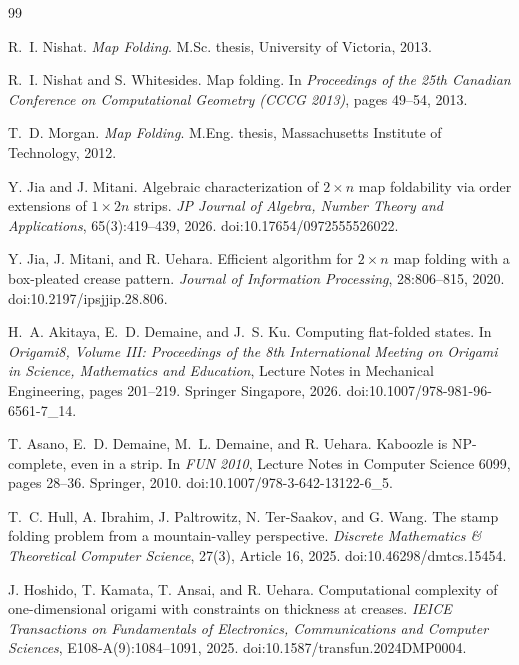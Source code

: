 \begin{thebibliography}{99}

R.~I. Nishat.
\newblock \emph{Map Folding}.
\newblock M.Sc. thesis, University of Victoria, 2013.

R.~I. Nishat and S. Whitesides.
\newblock Map folding.
\newblock In \emph{Proceedings of the 25th Canadian Conference on Computational Geometry (CCCG 2013)}, pages 49--54, 2013.

T.~D. Morgan.
\newblock \emph{Map Folding}.
\newblock M.Eng. thesis, Massachusetts Institute of Technology, 2012.

Y. Jia and J. Mitani.
\newblock Algebraic characterization of $2\times n$ map foldability via order extensions of $1\times 2n$ strips.
\newblock \emph{JP Journal of Algebra, Number Theory and Applications}, 65(3):419--439, 2026.
\newblock doi:10.17654/0972555526022.

Y. Jia, J. Mitani, and R. Uehara.
\newblock Efficient algorithm for $2\times n$ map folding with a box-pleated crease pattern.
\newblock \emph{Journal of Information Processing}, 28:806--815, 2020.
\newblock doi:10.2197/ipsjjip.28.806.

H.~A. Akitaya, E.~D. Demaine, and J.~S. Ku.
\newblock Computing flat-folded states.
\newblock In \emph{Origami8, Volume III: Proceedings of the 8th International Meeting on Origami in Science, Mathematics and Education}, Lecture Notes in Mechanical Engineering, pages 201--219. Springer Singapore, 2026.
\newblock doi:10.1007/978-981-96-6561-7\_14.

T. Asano, E.~D. Demaine, M.~L. Demaine, and R. Uehara.
\newblock Kaboozle is NP-complete, even in a strip.
\newblock In \emph{FUN 2010}, Lecture Notes in Computer Science 6099, pages 28--36. Springer, 2010.
\newblock doi:10.1007/978-3-642-13122-6\_5.

T.~C. Hull, A. Ibrahim, J. Paltrowitz, N. Ter-Saakov, and G. Wang.
\newblock The stamp folding problem from a mountain-valley perspective.
\newblock \emph{Discrete Mathematics \& Theoretical Computer Science}, 27(3), Article 16, 2025.
\newblock doi:10.46298/dmtcs.15454.

J. Hoshido, T. Kamata, T. Ansai, and R. Uehara.
\newblock Computational complexity of one-dimensional origami with constraints on thickness at creases.
\newblock \emph{IEICE Transactions on Fundamentals of Electronics, Communications and Computer Sciences}, E108-A(9):1084--1091, 2025.
\newblock doi:10.1587/transfun.2024DMP0004.


\end{thebibliography}
